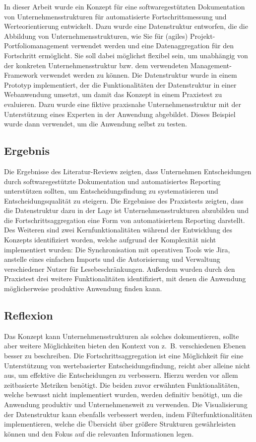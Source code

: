 In dieser Arbeit wurde ein Konzept für eine softwaregestützten Dokumentation von Unternehmensstrukturen für automatisierte Fortschrittsmessung und Werteorientierung entwickelt. Dazu wurde eine Datenstruktur entworfen, die die Abbildung von Unternehmensstrukturen, wie Sie für (agiles) Projekt-Portfoliomanagement verwendet werden und eine Datenaggregation für den Fortschritt ermöglicht. Sie soll dabei möglichst flexibel sein, um unabhängig von der konkreten Unternehmensstruktur bzw. dem verwendeten Management-Framework verwendet werden zu können. Die Datenstruktur wurde in einem Prototyp implementiert, der die Funktionalitäten der Datenstruktur in einer Webanwendung umsetzt, um damit das Konzept in einem Praxistest zu evaluieren. Dazu wurde eine fiktive praxisnahe Unternehmensstruktur mit der Unterstützung eines Experten in der Anwendung abgebildet. Dieses Beispiel wurde dann verwendet, um die Anwendung selbst zu testen.

\subsection{Ergebnis}
Die Ergebnisse des Literatur-Reviews zeigten, dass Unternehmen Entscheidungen durch softwaregestützte Dokumentation und automatisiertes Reporting unterstützen sollten, um Entscheidungsfindung zu systematisieren und Entscheidungsqualität zu steigern. Die Ergebnisse des Praxistests zeigten, dass die Datenstruktur dazu in der Lage ist Unternehmensstrukturen abzubilden und die Fortschrittsaggregation eine Form von automatisiertem Reporting darstellt. Des Weiteren sind zwei Kernfunktionalitäten während der Entwicklung des Konzepts identifiziert worden, welche aufgrund der Komplexität nicht implementiert wurden: Die Synchronisation mit operativen Tools wie Jira, anstelle eines einfachen Imports und die Autorisierung und Verwaltung verschiedener Nutzer für Lesebeschränkungen. Außerdem wurden durch den Praxistest drei weitere Funktionalitäten identifiziert, mit denen die Anwendung möglicherweise produktive Anwendung finden kann.

\subsection{Reflexion}
Das Konzept kann Unternehmensstrukturen als solches dokumentieren, sollte aber weitere Möglichkeiten bieten den Kontext von z. B. verschiedenen Ebenen besser zu beschreiben. Die Fortschrittsaggregation ist eine Möglichkeit für eine Unterstützung von wertebasierter Entscheidungsfindung, reicht aber alleine nicht aus, um effektive die Entscheidungen zu verbessern. Hierzu werden vor allem zeitbasierte Metriken benötigt. Die beiden zuvor erwähnten Funktionalitäten, welche bewusst nicht implementiert wurden, werden definitiv benötigt, um die Anwendung produktiv und Unternehmensweit zu verwenden. Die Visualisierung der Datenstruktur kann ebenfalls verbessert werden, indem Filterfunktionalitäten implementieren, welche die Übersicht über größere Strukturen gewährleisten können und den Fokus auf die relevanten Informationen legen.

